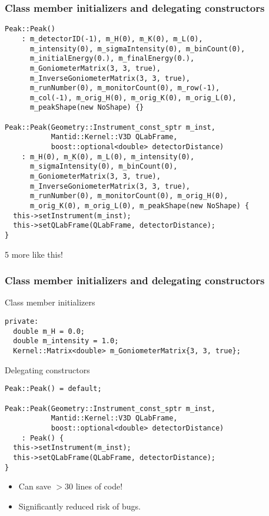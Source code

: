 \documentclass[english]{beamer}
\begin{document}
\begin{frame}[fragile]
    \frametitle{Class member initializers and delegating constructors}
\begin{lstlisting}
Peak::Peak()
    : m_detectorID(-1), m_H(0), m_K(0), m_L(0),
      m_intensity(0), m_sigmaIntensity(0), m_binCount(0),
      m_initialEnergy(0.), m_finalEnergy(0.),
      m_GoniometerMatrix(3, 3, true),
      m_InverseGoniometerMatrix(3, 3, true),
      m_runNumber(0), m_monitorCount(0), m_row(-1),
      m_col(-1), m_orig_H(0), m_orig_K(0), m_orig_L(0),
      m_peakShape(new NoShape) {}

Peak::Peak(Geometry::Instrument_const_sptr m_inst,
           Mantid::Kernel::V3D QLabFrame,
           boost::optional<double> detectorDistance)
    : m_H(0), m_K(0), m_L(0), m_intensity(0),
      m_sigmaIntensity(0), m_binCount(0),
      m_GoniometerMatrix(3, 3, true),
      m_InverseGoniometerMatrix(3, 3, true),
      m_runNumber(0), m_monitorCount(0), m_orig_H(0),
      m_orig_K(0), m_orig_L(0), m_peakShape(new NoShape) {
  this->setInstrument(m_inst);
  this->setQLabFrame(QLabFrame, detectorDistance);
}
\end{lstlisting}
5 more like this!
\end{frame}


\begin{frame}[fragile]
    \frametitle{Class member initializers and delegating constructors}
    \begin{block}{Class member initializers}
\vspace{-1mm}
\begin{lstlisting}
private:
  double m_H = 0.0;
  double m_intensity = 1.0;
  Kernel::Matrix<double> m_GoniometerMatrix{3, 3, true};
\end{lstlisting}
\vspace{-1mm}
\end{block}
\pause
\begin{block}{Delegating constructors}
\vspace{-1mm}
\begin{lstlisting}
Peak::Peak() = default;

Peak::Peak(Geometry::Instrument_const_sptr m_inst,
           Mantid::Kernel::V3D QLabFrame,
           boost::optional<double> detectorDistance)
    : Peak() {
  this->setInstrument(m_inst);
  this->setQLabFrame(QLabFrame, detectorDistance);
}
\end{lstlisting}
\vspace{-1mm}
\end{block}
\vspace{-1mm}
\begin{itemize}
    \item Can save $>30$ lines of code!
    \item Significantly reduced risk of bugs.
\end{itemize}

\end{frame}
\end{document}
